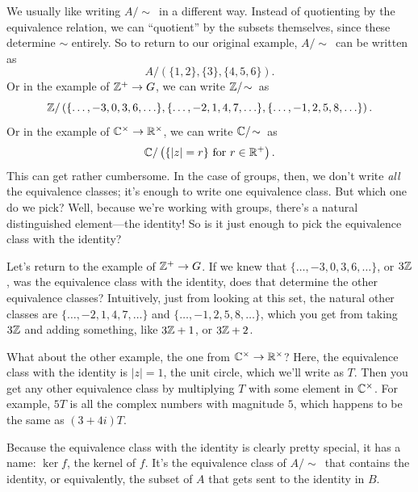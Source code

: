 \documentclass[11pt,paper=letter]{scrartcl}
\newcommand{\simm}{\!\sim\,}
\begin{document}
We usually like writing $A/\simm$ in a different way. Instead of quotienting by the equivalence relation, we can ``quotient'' by the subsets themselves, since these determine $\sim$ entirely. So to return to our original example, $A/\simm$ can be written as
\[
  A/\left(\{1, 2\}, \{3\}, \{4, 5, 6\}\right).
\]
Or in the example of $\mathbb Z^+ \to G$, we can write $\ZZ/\simm$ as
\[
  \mathbb Z/\left(\{\ldots, -3, 0, 3, 6, \ldots\}, \{\ldots, -2, 1, 4, 7, \ldots\},\{\ldots, -1, 2, 5, 8, \ldots\}\right).
\]
Or in the example of $\mathbb C^{\times} \to \mathbb R^\times$, we can write $\CC/\simm$ as
\[
  \mathbb C/\left(\{|z| = r\} \text{ for } r \in \mathbb R^{+}\right).
\]
This can get rather cumbersome. In the case of groups, then, we don't write \textit{all} the equivalence classes; it's enough to write one equivalence class. But which one do we pick? Well, because we're working with groups, there's a natural distinguished element---the identity! So is it just enough to pick the equivalence class with the identity?

\begin{example*}
Let's return to the example of $\mathbb Z^+ \to G$. If we knew that $\{\ldots, -3, 0, 3, 6, \ldots\}$, or $3\mathbb Z$, was the equivalence class with the identity, does that determine the other equivalence classes? Intuitively, just from looking at this set, the natural other classes are $\{\ldots, -2, 1, 4, 7, \ldots\}$ and $\{\ldots, -1, 2, 5, 8, \ldots\}$, which you get from taking $3\mathbb Z$ and adding something, like $3\mathbb Z + 1$, or $3\mathbb Z + 2$.
\end{example*}

\begin{example*}
What about the other example, the one from $\mathbb C^{\times} \to \mathbb R^{\times}$? Here, the equivalence class with the identity is $|z| = 1$, the unit circle, which we'll write as $T$. Then you get any other equivalence class by multiplying $T$ with some element in $\mathbb C^{\times}$. For example, $5T$ is all the complex numbers with magnitude $5$, which happens to be the same as $(3 + 4i)T$.
\end{example*}

Because the equivalence class with the identity is clearly pretty special, it has a name: $\ker f$, the kernel of $f$. It's the equivalence class of $A/\simm$ that contains the identity, or equivalently, the subset of $A$ that gets sent to the identity in $B$.
\end{document}
